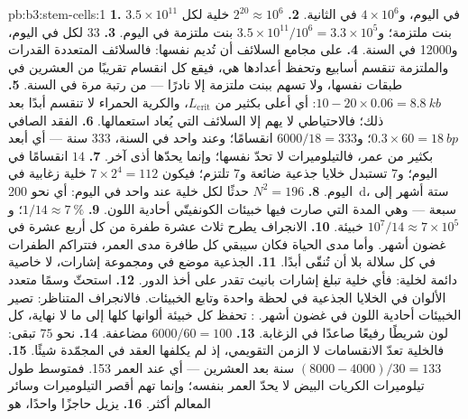 \begin{solution}{pb:b3:stem-cells:1}
\textbf{1.} $3.5\times 10^{11}$ في اليوم، و$4\times 10^{6}$ في الثانية.
\textbf{2.} $2^{20} \approx 10^{6}$ خلية لكل بنت ملتزمة؛
و$3.5\times 10^{11}/10^{6} = 3.3\times 10^{5}$ بنت ملتزمة في اليوم.
\textbf{3.} $33$ لكل  في اليوم، و\num{12000} في السنة.
\textbf{4.} على مجامع السلائف أن تُديم نفسها: فالسلائف
المتعددة القدرات والملتزمة تنقسم أسابيع وتحفظ أعدادها هي،
فيقع كل انقسام تقريبًا من العشرين في طبقات  نفسها، ولا
تسهم  ببنت ملتزمة إلا نادرًا --- من رتبة مرة
في السنة.
\textbf{5.} $10 - 20\times 0.06 = \qty{8.8}{kb}$: أي أعلى بكثير من
$L_{\text{crit}}$، والكرية الحمراء لا تنقسم أبدًا بعد ذلك؛
فالاحتياطي لا يهم إلا السلائف التي يُعاد استعمالها.
\textbf{6.} الفقد الصافي $0.3\times 60 = \qty{18}{bp}$؛ و$6000/18 = 333$
انقسامًا؛ وعند واحد في السنة، $333$ سنة --- أي أبعد بكثير من
عمر، فالتيلوميرات لا تحدّ  نفسها؛ وإنما يحدّها
أذى آخر.
\textbf{7.} $14$ انقسامًا في اليوم؛ و$7$ تستبدل خلايا جذعية
ضائعة و$7$ تلتزم؛ فيكون $7\times 2^{4} = 112$ خلية زغابية في اليوم.
\textbf{8.} $N^{2} = 196$ حدثًا لكل خلية عند واحد في اليوم: أي نحو
\qty{200}{d}، ستة أشهر إلى سبعة --- وهي المدة التي صارت فيها
خبيئات الكونفيتّي أحادية اللون.
\textbf{9.} $1/14 \approx \qty{7}{\%}$؛ و$10^{7}/14 \approx 7\times 10^{5}$
خبيئة.
\textbf{10.} الانجراف يطرح ثلاث عشرة طفرة من كل أربع عشرة في
غضون أشهر. وأما  مدى الحياة فكان سيبقي كل
 طافرة مدى العمر، فتتراكم الطفرات في كل سلالة بلا
أن تُنقّى أبدًا.
\textbf{11.} الجذعية موضع في  ومجموعة إشارات، لا خاصية
دائمة لخلية: فأي خلية تبلغ إشارات بانيث تقدر على أخذ الدور.
\textbf{12.} استحثّ وسمًا متعدد الألوان في الخلايا الجذعية في
لحظة واحدة وتابع الخبيئات. فالانجراف المتناظر: تصير الخبيئات
أحادية اللون في غضون أشهر. : تحفظ كل
خبيئة ألوانها كلها إلى ما لا نهاية، كل لون شريطًا رفيعًا
صاعدًا في الزغابة.
\textbf{13.} $6000/60 = 100$ مضاعفة.
\textbf{14.} نحو $75$ تبقى: فالخلية تعدّ الانقسامات لا الزمن
التقويمي، إذ لم يكلفها العقد في المجمّدة شيئًا.
\textbf{15.} $(8000 - 4000)/30 = 133$ سنة بعد العشرين --- أي عند
العمر 153. فمتوسط طول تيلوميرات الكريات البيض لا يحدّ العمر
بنفسه؛ وإنما تهم أقصر التيلوميرات وسائر المعالم أكثر.
\textbf{16.}  يزيل حاجزًا واحدًا، هو 
\end{solution}
